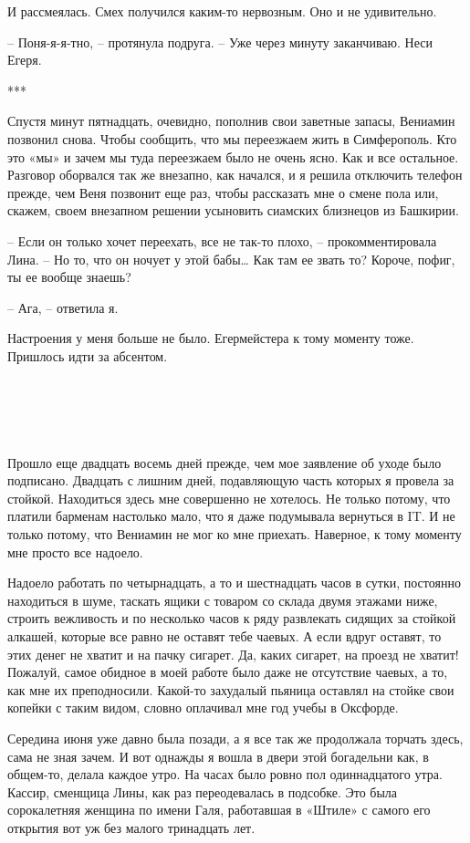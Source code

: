 \documentclass[
]{book}
\begin{document}
И рассмеялась. Смех получился каким-то нервозным. Оно и не удивительно.

-- Поня-я-я-тно, -- протянула подруга. -- Уже через минуту заканчиваю. Неси Егеря.

***

Спустя минут пятнадцать, очевидно, пополнив свои заветные запасы, Вениамин позвонил снова. Чтобы сообщить, что мы переезжаем жить в Симферополь. Кто это «мы» и зачем мы туда переезжаем было не очень ясно. Как и все остальное. Разговор оборвался так же внезапно, как начался, и я решила отключить телефон прежде, чем Веня позвонит еще раз, чтобы рассказать мне о смене пола или, скажем, своем внезапном решении усыновить сиамских близнецов из Башкирии.

-- Если он только хочет переехать, все не так-то плохо, -- прокомментировала Лина. -- Но то, что он ночует у этой бабы\ldots{} Как там ее звать то? Короче, пофиг, ты ее вообще знаешь?

-- Ага, -- ответила я.

Настроения у меня больше не было. Егермейстера к тому моменту тоже. Пришлось идти за абсентом.

\hypertarget{chapter-44}{%
\chapter{~}\label{chapter-44}}

Прошло еще двадцать восемь дней прежде, чем мое заявление об уходе было подписано. Двадцать с лишним дней, подавляющую часть которых я провела за стойкой. Находиться здесь мне совершенно не хотелось. Не только потому, что платили барменам настолько мало, что я даже подумывала вернуться в IT. И не только потому, что Вениамин не мог ко мне приехать. Наверное, к тому моменту мне просто все надоело.

Надоело работать по четырнадцать, а то и шестнадцать часов в сутки, постоянно находиться в шуме, таскать ящики с товаром со склада двумя этажами ниже, строить вежливость и по несколько часов к ряду развлекать сидящих за стойкой алкашей, которые все равно не оставят тебе чаевых. А если вдруг оставят, то этих денег не хватит и на пачку сигарет. Да, каких сигарет, на проезд не хватит! Пожалуй, самое обидное в моей работе было даже не отсутствие чаевых, а то, как мне их преподносили. Какой-то захудалый пьяница оставлял на стойке свои копейки с таким видом, словно оплачивал мне год учебы в Оксфорде.

Середина июня уже давно была позади, а я все так же продолжала торчать здесь, сама не зная зачем. И вот однажды я вошла в двери этой богадельни как, в общем-то, делала каждое утро. На часах было ровно пол одиннадцатого утра. Кассир, сменщица Лины, как раз переодевалась в подсобке. Это была сорокалетняя женщина по имени Галя, работавшая в «Штиле» с самого его открытия вот уж без малого тринадцать лет.
\end{document}

